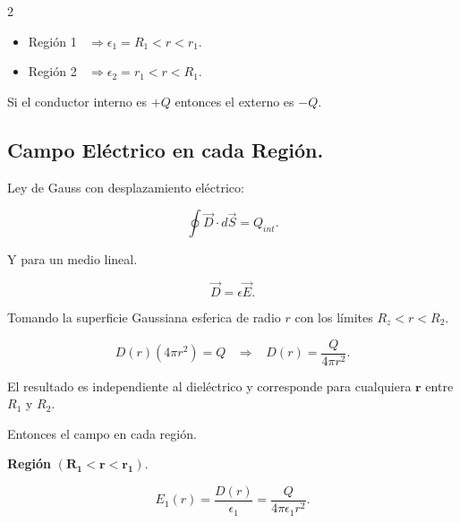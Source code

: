 \documentclass[a4paper,12pt]{article} %
\begin{document}
\begin{multicols}{2}
	\begin{itemize}
		\item Región 1 \( \;\; \Rightarrow \epsilon_1 = R_1 < r < r_1. \)

		\item Región 2 \( \;\; \Rightarrow \epsilon_2 = r_1 < r < R_1. \)
	\end{itemize}
\end{multicols}

\begin{justify}
	Si el conductor interno es \(+Q\) entonces el externo es \(-Q\).
\end{justify}


\subsection{Campo Eléctrico en cada Región.}

\begin{justify}
	Ley de Gauss con desplazamiento eléctrico:
\end{justify}

\[ \oint \vec{D} \cdot d\vec{S} = Q_{int}. \]

\begin{justify}
	Y para un medio lineal.
\end{justify}

\[ \vec{D} = \epsilon \vec{E}. \]

\begin{justify}
	Tomando la superficie Gaussiana esferica de radio \(r\) con los límites \( R_z < r < R_2 \).
\end{justify}

\[ D\left(r\right) \left(4 \pi r^2 \right) = Q \;\;\; \Rightarrow \;\;\; D\left(r\right) = \frac{Q}{4 \pi r^2}.  \]

\begin{justify}
	El resultado es independiente al dieléctrico y corresponde para cualquiera \(\mathbf{r}\) entre \(R_1\) y \(R_2\).
\end{justify}

\begin{justify}
	Entonces el campo en cada región.
\end{justify}

\begin{justify}
	\textbf{Región} \(\mathbf{ \left( R_1 < r < r_1 \right). }\)
\end{justify}

\[ E_1 \left( r \right) = \frac{D \left( r \right)}{\epsilon_1} = \frac{Q}{4 \pi \epsilon_1 r^2}. \]
\end{document}
